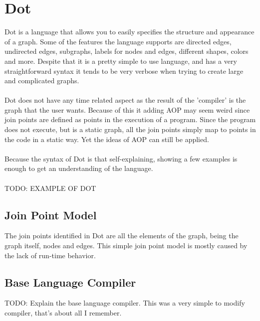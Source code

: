 \documentclass[a4paper]{report}
\begin{document}
\chapter{Dot}
Dot is a language that allows you to easily specifies the structure and appearance of a graph. Some of the features the language supports  are directed edges, undirected edges, subgraphs, labels for nodes and edges, different shapes, colors and more. Despite that it is a pretty simple to use language, and has a very straightforward syntax it tends to be very verbose when trying to create large and complicated graphs.\\
\\
Dot does not have any time related aspect as the result of the 'compiler' is the graph that the user wants. Because of this it adding AOP may seem weird since join points are defined as points in the execution of a program. Since the program does not execute, but is a static graph, all the join points simply map to points in the code in a static way. Yet the ideas of AOP can still be applied.\\
\\
Because the syntax of Dot is that self-explaining, showing a few examples is enough to get an understanding of the language.\\
\\
TODO: EXAMPLE OF DOT

\section{Join Point Model}
The join points identified in Dot are all the elements of the graph, being the graph itself, nodes and edges. This simple join point model is mostly caused by the lack of run-time behavior.

\section{Base Language Compiler}
TODO: Explain the base language compiler. This was a very simple to modify compiler, that's about all I remember.
\end{document}
